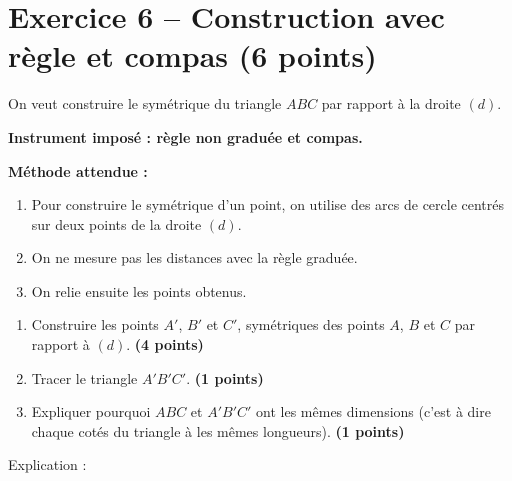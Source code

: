 \documentclass[11pt,a4paper]{article}
\newcommand{\points}[1]{\hfill \textbf{(#1 points)}}
\begin{document}
\dotfill

\dotfill


\section*{Exercice 6 -- Construction avec règle et compas \points{6}}

On veut construire le symétrique du triangle $ABC$ par rapport à la droite $(d)$.

\medskip

\textbf{Instrument imposé : règle non graduée et compas.}

\medskip

\textbf{Méthode attendue :}
\begin{enumerate}[label=\textbullet]
    \item Pour construire le symétrique d'un point, on utilise des arcs de cercle centrés sur deux points de la droite $(d)$.
    \item On ne mesure pas les distances avec la règle graduée.
    \item On relie ensuite les points obtenus.
\end{enumerate}

\begin{center}
\end{center}

\begin{enumerate}[label=\arabic*)]
    \item Construire les points $A'$, $B'$ et $C'$, symétriques des points $A$, $B$ et $C$ par rapport à $(d)$. \points{4}
    \item Tracer le triangle $A'B'C'$. \points{1}
    \item Expliquer pourquoi $ABC$ et $A'B'C'$ ont les mêmes dimensions (c'est à dire chaque cotés du triangle à les mêmes longueurs). \points{1}
\end{enumerate}

\vspace{0.6cm}

Explication :

\dotfill

\dotfill

\dotfill
\end{document}
